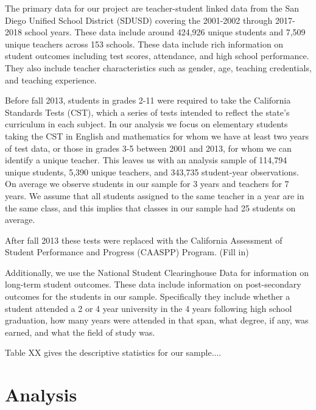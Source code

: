 \documentclass[letterpaper,12pt]{article}
\begin{document}
The primary data for our project are teacher-student linked data from the San Diego Unified School District (SDUSD) covering the 2001-2002 through 2017-2018 school years. These data include around 424,926 unique students and 7,509 unique teachers across 153 schools. These data include rich information on student outcomes including test scores, attendance, and high school performance. They also include teacher characteristics such as gender, age, teaching credentials, and teaching experience.

Before fall 2013, students in grades 2-11 were required to take the California Standards Tests (CST), which a series of tests intended to reflect the state's curriculum in each subject. In our analysis we focus on elementary students taking the CST in English and mathematics for whom we have at least two years of test data, or those in grades 3-5 between 2001 and 2013, for whom we can identify a unique teacher. This leaves us with an analysis sample of 114,794 unique students, 5,390 unique teachers, and 343,735 student-year observations. On average we observe students in our sample for 3 years and teachers for 7 years. We assume that all students assigned to the same teacher in a year are in the same class, and this implies that classes in our sample had 25 students on average.

After fall 2013 these tests were replaced with the California Assessment of Student Performance and Progress (CAASPP) Program. (Fill in)

Additionally, we use the National Student Clearinghouse Data for information on long-term student outcomes. These data include information on post-secondary outcomes for the students in our sample. Specifically they include whether a student attended a 2 or 4 year university in the 4 years following high school graduation, how many years were attended in that span, what degree, if any, was earned, and what the field of study was.

Table XX gives the descriptive statistics for our sample....





\section{Analysis}\label{sec: Analysis}
\end{document}
